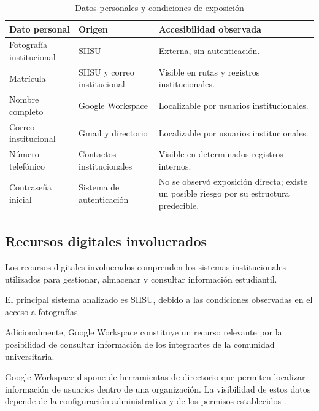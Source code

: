 \documentclass[12pt]{article}
\begin{document}
\begin{table}[H]
\centering
\caption{Datos personales y condiciones de exposición}
\label{tab:datos_personales}
\small
\begin{tabularx}{\textwidth}{|X|X|X|}
\hline
\textbf{Dato personal} &
\textbf{Origen} &
\textbf{Accesibilidad observada} \\ \hline

Fotografía institucional &
SIISU &
Externa, sin autenticación. \\ \hline

Matrícula &
SIISU y correo institucional &
Visible en rutas y registros institucionales. \\ \hline

Nombre completo &
Google Workspace &
Localizable por usuarios institucionales. \\ \hline

Correo institucional &
Gmail y directorio &
Localizable por usuarios institucionales. \\ \hline

Número telefónico &
Contactos institucionales &
Visible en determinados registros internos. \\ \hline

Contraseña inicial &
Sistema de autenticación &
No se observó exposición directa;
existe un posible riesgo por su
estructura predecible. \\ \hline

\end{tabularx}
\end{table}


\subsection{Recursos digitales involucrados}

Los recursos digitales involucrados comprenden
los sistemas institucionales utilizados para
gestionar, almacenar y consultar información
estudiantil.

El principal sistema analizado es SIISU,
debido a las condiciones observadas en
el acceso a fotografías.

Adicionalmente, Google Workspace constituye
un recurso relevante por la posibilidad
de consultar información de los integrantes
de la comunidad universitaria.

Google Workspace dispone de herramientas
de directorio que permiten localizar
información de usuarios dentro de una
organización. La visibilidad de estos
datos depende de la configuración
administrativa y de los permisos
establecidos \parencite{googleworkspace}.
\end{document}
